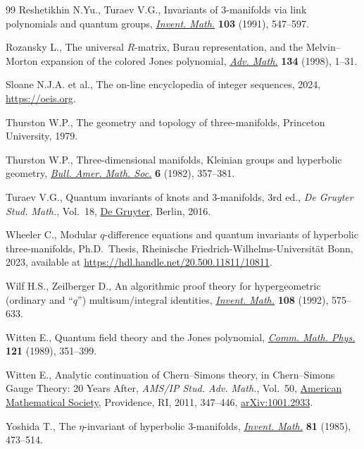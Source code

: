 \documentclass[pdftex]{sigma}
\numberwithin{equation}{section}
\begin{document}
\begin{thebibliography}{99}
Reshetikhin N.Yu., Turaev V.G., Invariants of {$3$}-manifolds via link
  polynomials and quantum groups, \href{https://doi.org/10.1007/BF01239527}{\textit{Invent. Math.}} \textbf{103} (1991),
  547--597.

Rozansky L., The universal {$R$}-matrix, {B}urau representation, and the
  {M}elvin--{M}orton expansion of the colored {J}ones polynomial, \href{https://doi.org/10.1006/aima.1997.1661}{\textit{Adv.
  Math.}} \textbf{134} (1998), 1--31.

Sloane N.J.A. et al., The on-line encyclopedia of integer sequences,
  2024, \url{https://oeis.org}.

Thurston W.P., The geometry and topology of three-manifolds, Princeton
  University, 1979.

Thurston W.P., Three-dimensional manifolds, {K}leinian groups and hyperbolic
  geometry, \href{https://doi.org/10.1090/S0273-0979-1982-15003-0}{\textit{Bull. Amer. Math. Soc.}} \textbf{6} (1982), 357--381.

Turaev V.G., Quantum invariants of knots and 3-manifolds, 3rd ed., \textit{De Gruyter Stud. Math.}, Vol.~18, \href{https://doi.org/10.1515/9783110435221}{De Gruyter}, Berlin, 2016.

Wheeler C., Modular $q$-difference equations and quantum invariants of
  hyperbolic three-manifolds, Ph.D.~Thesis, {R}heinische
  Friedrich-Wilhelms-Universit\"at Bonn, 2023, available at
  \url{https://hdl.handle.net/20.500.11811/10811}.

Wilf H.S., Zeilberger D., An algorithmic proof theory for hypergeometric
  (ordinary and ``{$q$}'') multisum/integral identities, \href{https://doi.org/10.1007/BF02100618}{\textit{Invent. Math.}}
  \textbf{108} (1992), 575--633.

Witten E., Quantum field theory and the {J}ones polynomial, \href{https://doi.org/10.1007/BF01217730}{\textit{Comm. Math.
  Phys.}} \textbf{121} (1989), 351--399.

Witten E., Analytic continuation of {C}hern--{S}imons theory, in
  {C}hern--{S}imons Gauge Theory: 20 Years After, \textit{AMS/IP Stud. Adv.
  Math.}, Vol.~50, \href{https://doi.org/10.1090/amsip/050/19}{American Mathematical Society}, Providence, RI, 2011,
  347--446, \href{https://arxiv.org/abs/1001.2933}{arXiv:1001.2933}.

Yoshida T., The {$\eta$}-invariant of hyperbolic {$3$}-manifolds,
  \href{https://doi.org/10.1007/BF01388583}{\textit{Invent. Math.}} \textbf{81} (1985), 473--514.


\end{thebibliography}
\end{document}
